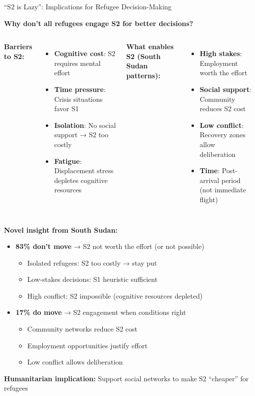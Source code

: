 \documentclass[aspectratio=169]{beamer}
\begin{document}
\begin{frame}{``S2 is Lazy'': Implications for Refugee Decision-Making}

\textbf{Why don't all refugees engage S2 for better decisions?}

\begin{columns}[T]
\textbf{Barriers to S2:}
\begin{itemize}
    \item \textbf{Cognitive cost}: S2 requires mental effort
    \item \textbf{Time pressure}: Crisis situations favor S1
    \item \textbf{Isolation}: No social support → S2 too costly
    \item \textbf{Fatigue}: Displacement stress depletes cognitive resources
\end{itemize}

\textbf{What enables S2 (South Sudan patterns):}
\begin{itemize}
    \item \textbf{High stakes}: Employment worth the effort
    \item \textbf{Social support}: Community reduces S2 cost
    \item \textbf{Low conflict}: Recovery zones allow deliberation
    \item \textbf{Time}: Post-arrival period (not immediate flight)
\end{itemize}
\end{columns}

\vspace{0.5em}

\textbf{Novel insight from South Sudan:}
\begin{itemize}
    \item \textbf{83\% don't move} → S2 not worth the effort (or not possible)
    \begin{itemize}
        \item Isolated refugees: S2 too costly → stay put
        \item Low-stakes decisions: S1 heuristic sufficient
        \item High conflict: S2 impossible (cognitive resources depleted)
    \end{itemize}
    \item \textbf{17\% do move} → S2 engagement when conditions right
    \begin{itemize}
        \item Community networks reduce S2 cost
        \item Employment opportunities justify effort
        \item Low conflict allows deliberation
    \end{itemize}
\end{itemize}

\vspace{0.5em}

\textbf{Humanitarian implication:} Support social networks to make S2 ``cheaper'' for refugees

\end{frame}
\end{document}
